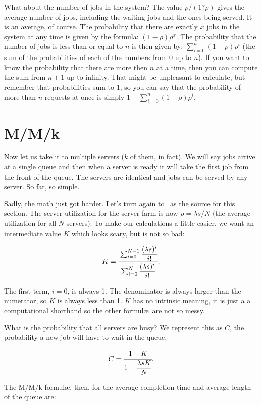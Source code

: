 What about the number of jobs in the system? The value $\rho/(1 ? \rho)$ gives the average number of jobs, including the waiting jobs and the ones being served. It is an average, of course. The probability that there are exactly $x$ jobs in the system at any time is given by the formula: $(1-\rho)\rho^{x}$. The probability that the number of jobs is less than or equal to $n$ is then given by: $\sum\limits_{i=0}^{n}(1-\rho)\rho^{i}$ (the sum of the probabilities of each of the numbers from 0 up to $n$). If you want to know the probability that there are more then $n$ at a time, then you can compute the sum from $n+1$ up to infinity. That might be unpleasant to calculate, but remember that probabilities sum to 1, so you can say that the probability of more than $n$ requests at once is simply $1 - \sum\limits_{i=0}^{n}(1-\rho)\rho^{i}$.

\section*{M/M/k}

Now let us take it to multiple servers ($k$ of them, in fact). We will say jobs arrive at a single queue and then when a server is ready it will take the first job from the front of the queue. The servers are identical and jobs can be served by any server. So far, so simple.

Sadly, the math just got harder. Let's turn again to~\cite{williams-q} as the source for this section. The server utilization for the server farm is now $\rho = \lambda s / N$ (the average utilization for all $N$ servers). To make our calculations a little easier, we want an intermediate value $K$ which looks scary, but is not so bad:

\[ K = \cfrac{\sum_{i=0}^{N-1}\dfrac{(\lambda s)^{i}}{i!}}{{\sum_{i=0}^{N}\dfrac{(\lambda s)^{i}}{i!}}}.
\]

The first term, $i = 0$, is always 1. The denominator is always larger than the numerator, so $K$ is always less than 1. $K$ has no intrinsic meaning, it is just a a computational shorthand so the other formul\ae\  are not so messy.

What is the probability that all servers are busy? We represent this as $C$, the probability a new job will have to wait in the queue.

\[C = \cfrac{1 - K}{1 - \dfrac{\lambda s K}{N}}.\]

The M/M/k formul\ae, then, for the average completion time and average length of the queue are:

